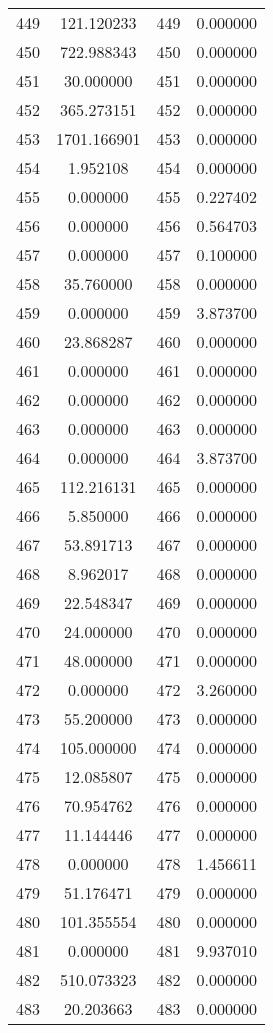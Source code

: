 \documentclass[12pt]{article}
\begin{document}
\begin{longtable}{@{}cccc@{}}
449 & 121.120233 & 449 & 0.000000 \\
450 & 722.988343 & 450 & 0.000000 \\
451 & 30.000000 & 451 & 0.000000 \\
452 & 365.273151 & 452 & 0.000000 \\
453 & 1701.166901 & 453 & 0.000000 \\
454 & 1.952108 & 454 & 0.000000 \\
455 & 0.000000 & 455 & 0.227402 \\
456 & 0.000000 & 456 & 0.564703 \\
457 & 0.000000 & 457 & 0.100000 \\
458 & 35.760000 & 458 & 0.000000 \\
459 & 0.000000 & 459 & 3.873700 \\
460 & 23.868287 & 460 & 0.000000 \\
461 & 0.000000 & 461 & 0.000000 \\
462 & 0.000000 & 462 & 0.000000 \\
463 & 0.000000 & 463 & 0.000000 \\
464 & 0.000000 & 464 & 3.873700 \\
465 & 112.216131 & 465 & 0.000000 \\
466 & 5.850000 & 466 & 0.000000 \\
467 & 53.891713 & 467 & 0.000000 \\
468 & 8.962017 & 468 & 0.000000 \\
469 & 22.548347 & 469 & 0.000000 \\
470 & 24.000000 & 470 & 0.000000 \\
471 & 48.000000 & 471 & 0.000000 \\
472 & 0.000000 & 472 & 3.260000 \\
473 & 55.200000 & 473 & 0.000000 \\
474 & 105.000000 & 474 & 0.000000 \\
475 & 12.085807 & 475 & 0.000000 \\
476 & 70.954762 & 476 & 0.000000 \\
477 & 11.144446 & 477 & 0.000000 \\
478 & 0.000000 & 478 & 1.456611 \\
479 & 51.176471 & 479 & 0.000000 \\
480 & 101.355554 & 480 & 0.000000 \\
481 & 0.000000 & 481 & 9.937010 \\
482 & 510.073323 & 482 & 0.000000 \\
483 & 20.203663 & 483 & 0.000000 \\

\end{longtable}
\end{document}
